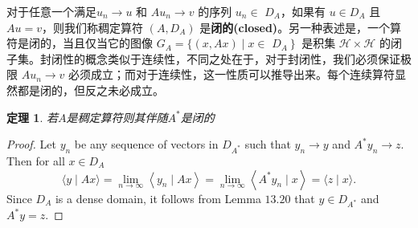\documentclass[hyperref,UTF8]{ctexbook}
\newtheorem{theorem}{定理}[chapter]
\begin{document}
对于任意一个满足\(u_{n} \rightarrow u\) 和 \(A u_{n} \rightarrow v\) 的序列 \(u_{n} \in\) \( D_{A}\)，如果有 \(u \in D_{A}\) 且 \(A u=v\)，则我们称稠定算符 \(\left(A, D_{A}\right)\) 是\textbf{闭的(closed)}。另一种表述是，一个算符是闭的，当且仅当它的图像 \(G_{A}=\{(x, A x) \mid x \in\) \(\left.D_{A} \right\}\) 是积集 \(\mathcal{H} \times \mathcal{H}\) 的闭子集。封闭性的概念类似于连续性，不同之处在于，对于封闭性，我们必须保证极限 \(A u_{n} \rightarrow v\) 必须成立；而对于连续性，这一性质可以推导出来。每个连续算符显然都是闭的，但反之未必成立。
\begin{theorem}\label{thm:13.21}
    若\(A\)是稠定算符则其伴随\(A^*\)是闭的
\end{theorem}
\begin{proof}
     Let \(y_{n}\) be any sequence of vectors in \(D_{A^{*}}\) such that \(y_{n} \rightarrow y\) and \(A^{*} y_{n} \rightarrow z\). Then for all \(x \in D_{A}\)
\[
\langle y \mid A x\rangle=\lim _{n \rightarrow \infty}\left\langle y_{n} \mid A x\right\rangle=\lim _{n \rightarrow \infty}\left\langle A^{*} y_{n} \mid x\right\rangle=\langle z \mid x\rangle .
\]
Since \(D_{A}\) is a dense domain, it follows from Lemma \(13.20\) that \(y \in D_{A^{*}}\) and \(A^{*} y=z\).

\end{proof}
\end{document}
